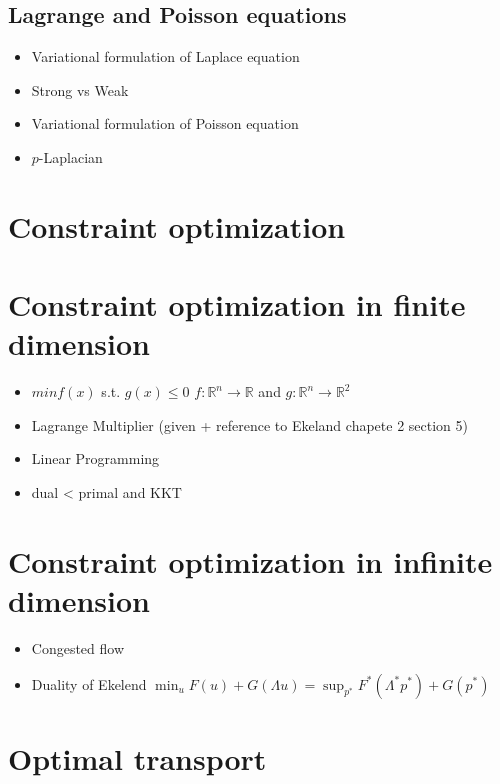 \documentclass{article}
\newcommand{\REAL}{ \mathbb{R}}
\begin{document}
\subsection{Lagrange and Poisson equations}
\begin{itemize}
\item Variational formulation of Laplace equation
\item Strong vs Weak
\item Variational formulation of Poisson equation
 \item $p$-Laplacian
\end{itemize}

\section{Constraint optimization}

\section{Constraint optimization in finite dimension}
\begin{itemize}
  \item  $min f(x)$ s.t. $g(x)\leq 0 $ $f:\REAL^n\to \REAL$ and $g:\REAL^n\to \REAL^2$
  \item Lagrange Multiplier (given + reference to Ekeland chapete 2 section 5)
  \item Linear Programming
  \item dual < primal and KKT
\end{itemize}

\section{Constraint optimization in infinite dimension}
\begin{itemize}
\item Congested flow
\item Duality of Ekelend $\min_{u} F(u) + G(\Lambda u)=\sup_{p^*}F^*(\Lambda^* p^*)+G(p^*)$
\end{itemize}

\section{Optimal transport}
\end{document}
